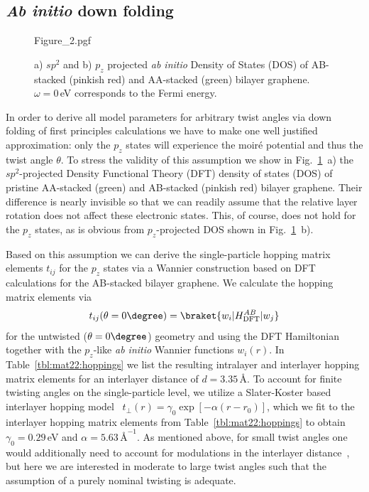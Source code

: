 \subsection{\textit{Ab initio} down folding}
    
\begin{figure}
    \centering
    {Figure_2.pgf}
    \caption{a) $sp^2$ and b) $p_z$ projected \textit{ab initio} Density of States (DOS) of AB-stacked (pinkish red) and AA-stacked (green) bilayer graphene. $\omega=0\,$eV corresponds to the Fermi energy.}
    \label{fig:mat22:ab} 
\end{figure}
    
In order to derive all model parameters for arbitrary twist angles via down folding of first principles calculations we have to make one well justified approximation: only the $p_z$ states will experience the moir\'e potential and thus the twist angle $\theta$.  To stress the validity of this assumption we show in Fig.~\ref{fig:mat22:ab}~a) the $sp^2$-projected Density Functional Theory (DFT) density of states (DOS) of pristine AA-stacked (green) and AB-stacked (pinkish red) bilayer graphene. Their difference is nearly invisible so that we can readily assume that the relative layer rotation does not affect these electronic states. This, of course, does not hold for the $p_z$ states, as is obvious from $p_z$-projected DOS shown in Fig.~\ref{fig:mat22:ab}~b).

Based on this assumption we can derive the single-particle hopping matrix elements $t_{ij}$ for the $p_z$ states via a Wannier construction based on DFT calculations for the AB-stacked bilayer graphene.%
We calculate the hopping matrix elements via
\begin{equation*}
    t_{ij}(\theta=0\degree) = \braket{ w_i | H_\text{DFT}^{AB} | w_j }
\end{equation*}
for the untwisted ($\theta=0\degree$) geometry and using the DFT Hamiltonian together with the $p_z$-like \textit{ab initio} Wannier functions $w_i(r)$. In Table~\ref{tbl:mat22:hoppings} we list the resulting intralayer and interlayer hopping matrix elements for an interlayer distance of $d=3.35\,$\AA. To account for finite twisting angles on the single-particle level, we utilize a Slater-Koster based interlayer hopping model~\cite{guinea_continuum_2019} $t_\perp(r) = \gamma_0 \operatorname{exp}[-\alpha (r-r_0)]$, which we fit to the interlayer hopping matrix elements from Table~\ref{tbl:mat22:hoppings} to obtain $\gamma_0 = 0.29\,$eV and $\alpha = 5.63\,\text{\AA}^{-1}$. As mentioned above, for small twist angles one would additionally need to account for modulations in the interlayer distance~\cite{wijk_relaxation_2015,shi_large-area_2020,gornostyrev_origin_2020}, but here we are interested in moderate to large twist angles such that the assumption of a purely nominal twisting is adequate.


